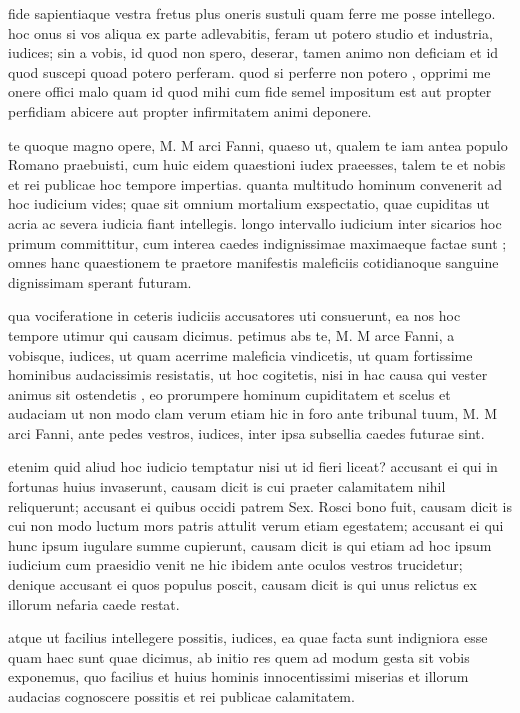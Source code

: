  fide sapientiaque vestra fretus plus oneris sustuli quam ferre me posse intellego. hoc onus si vos aliqua ex parte adlevabitis, feram ut potero studio et industria, iudices; sin a vobis, id quod non spero, deserar, tamen animo non deficiam et id quod suscepi quoad potero perferam. quod si perferre non potero , opprimi me onere offici malo quam id quod mihi cum fide semel impositum est aut propter perfidiam abicere aut propter infirmitatem animi deponere.

 te quoque magno opere, M. M arci Fanni, quaeso ut, qualem te iam antea populo Romano praebuisti, cum huic eidem quaestioni iudex praeesses, talem te et nobis et rei publicae hoc tempore impertias. quanta multitudo hominum convenerit ad hoc iudicium vides; quae sit omnium mortalium exspectatio, quae cupiditas ut acria ac severa iudicia fiant intellegis. longo intervallo iudicium inter sicarios hoc primum committitur, cum interea caedes indignissimae maximaeque factae sunt ; omnes hanc quaestionem te praetore manifestis maleficiis cotidianoque sanguine dignissimam sperant futuram.

 qua vociferatione in ceteris iudiciis accusatores uti consuerunt, ea nos hoc tempore utimur qui causam dicimus. petimus abs te, M. M arce Fanni, a vobisque, iudices, ut quam acerrime maleficia vindicetis, ut quam fortissime hominibus audacissimis resistatis, ut hoc cogitetis, nisi in hac causa qui vester animus sit ostendetis , eo prorumpere hominum cupiditatem et scelus et audaciam ut non modo clam verum etiam hic in foro ante tribunal tuum, M. M arci Fanni, ante pedes vestros, iudices, inter ipsa subsellia caedes futurae sint.

 etenim quid aliud hoc iudicio temptatur nisi ut id fieri liceat? accusant ei qui in fortunas huius invaserunt, causam dicit is cui praeter calamitatem nihil reliquerunt; accusant ei quibus occidi patrem Sex. Rosci bono fuit, causam dicit is cui non modo luctum mors patris attulit verum etiam egestatem; accusant ei qui hunc ipsum iugulare summe cupierunt, causam dicit is qui etiam ad hoc ipsum iudicium cum praesidio venit ne hic ibidem ante oculos vestros trucidetur; denique accusant ei quos populus poscit, causam dicit is qui unus relictus ex illorum nefaria caede restat.

 atque ut facilius intellegere possitis, iudices, ea quae facta sunt indigniora esse quam haec sunt quae dicimus, ab initio res quem ad modum gesta sit vobis exponemus, quo facilius et huius hominis innocentissimi miserias et illorum audacias cognoscere possitis et rei publicae calamitatem.

